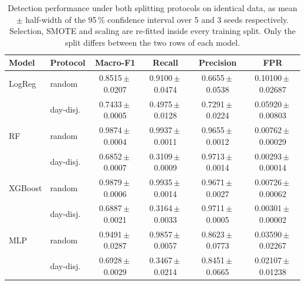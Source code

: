 \begin{table}[htbp]
\centering
\caption{Detection performance under both splitting protocols on identical data, as mean $\pm$ half-width of the 95\,\% confidence interval over 5 and 3 seeds respectively. Selection, SMOTE and scaling are re-fitted inside every training split. Only the split differs between the two rows of each model.}
\label{tab:protocols}
\footnotesize
\begin{tabular}{llcccc}
\hline
Model & Protocol & Macro-F1 & Recall & Precision & FPR \\
\hline
LogReg & random & 0.8515\,$\pm$\,0.0207 & 0.9100\,$\pm$\,0.0474 & 0.6655\,$\pm$\,0.0538 & 0.10100\,$\pm$\,0.02687 \\
 & day-disj. & 0.7433\,$\pm$\,0.0005 & 0.4975\,$\pm$\,0.0128 & 0.7291\,$\pm$\,0.0224 & 0.05920\,$\pm$\,0.00803 \\
RF & random & 0.9874\,$\pm$\,0.0004 & 0.9937\,$\pm$\,0.0011 & 0.9655\,$\pm$\,0.0012 & 0.00762\,$\pm$\,0.00029 \\
 & day-disj. & 0.6852\,$\pm$\,0.0007 & 0.3109\,$\pm$\,0.0009 & 0.9713\,$\pm$\,0.0014 & 0.00293\,$\pm$\,0.00014 \\
XGBoost & random & 0.9879\,$\pm$\,0.0006 & 0.9935\,$\pm$\,0.0014 & 0.9671\,$\pm$\,0.0027 & 0.00726\,$\pm$\,0.00062 \\
 & day-disj. & 0.6887\,$\pm$\,0.0021 & 0.3164\,$\pm$\,0.0033 & 0.9711\,$\pm$\,0.0005 & 0.00301\,$\pm$\,0.00002 \\
MLP & random & 0.9491\,$\pm$\,0.0287 & 0.9857\,$\pm$\,0.0057 & 0.8623\,$\pm$\,0.0773 & 0.03590\,$\pm$\,0.02267 \\
 & day-disj. & 0.6928\,$\pm$\,0.0029 & 0.3467\,$\pm$\,0.0214 & 0.8451\,$\pm$\,0.0665 & 0.02107\,$\pm$\,0.01238 \\
\hline
\end{tabular}
\end{table}
